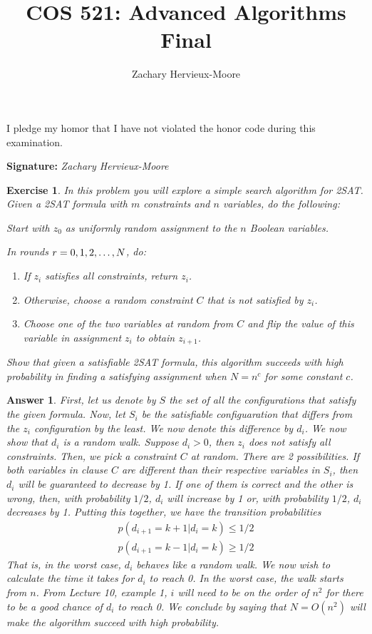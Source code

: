 \documentclass[12pt]{article}
\title{COS 521: Advanced Algorithms \\ Final}
\author{Zachary Hervieux-Moore}
\date{\displaydate{date}}
\theoremstyle{colon}
\newtheorem{exercise}{Exercise}
\newtheorem*{answer}{Answer}
\begin{document}
\maketitle

I pledge my homor that I have not violated the honor code during this examination.

\textbf{Signature: } \textit{Zachary Hervieux-Moore}

\clearpage

\begin{exercise}
  In this problem you will explore a simple search algorithm for 2SAT. Given a 2SAT formula with $m$ constraints and $n$ variables, do the following:

  Start with $z_0$ as uniformly random assignment to the $n$ Boolean variables.

  In rounds $r = 0, 1, 2, \mathellipsis, N$, do:

  \begin{enumerate}[label=\alph*)]
    \item If $z_i$ satisfies all constraints, return $z_i$.
    \item Otherwise, choose a random constraint $C$ that is not satisfied by $z_i$.
    \item Choose one of the two variables at random from $C$ and flip the value of this variable in assignment $z_i$ to obtain $z_{i+1}$.
  \end{enumerate}

  Show that given a satisfiable 2SAT formula, this algorithm succeeds with high probability in finding a satisfying assignment when $N = n^c$ for some constant $c$.
\end{exercise}

\begin{answer}
  First, let us denote by $S$ the set of all the configurations that satisfy the given formula. Now, let $S_i$ be the satisfiable configuaration that differs from the $z_i$ configuration by the least. We now denote this difference by $d_i$. We now show that $d_i$ is a random walk. Suppose $d_i > 0$, then $z_i$ does not satisfy all constraints. Then, we pick a constraint $C$ at random. There are 2 possibilities. If both variables in clause $C$ are different than their respective variables in $S_i$, then $d_i$ will be guaranteed to decrease by 1. If one of them is correct and the other is wrong, then, with probability $1/2$, $d_i$ will increase by 1 or, with probability $1/2$, $d_i$ decreases by 1. Putting this together, we have the transition probabilities
  \begin{gather*}
    p(d_{i+1} = k+1 | d_i = k) \leq 1/2 \\
    p(d_{i+1} = k-1 | d_i = k) \geq 1/2
  \end{gather*}
  That is, in the worst case, $d_i$ behaves like a random walk. We now wish to calculate the time it takes for $d_i$ to reach 0. In the worst case, the walk starts from $n$. From Lecture 10, example 1, $i$ will need to be on the order of $n^2$ for there to be a good chance of $d_i$ to reach 0. We conclude by saying that $N = O(n^2)$ will make the algorithm succeed with high probability.
\end{answer}
\end{document}
